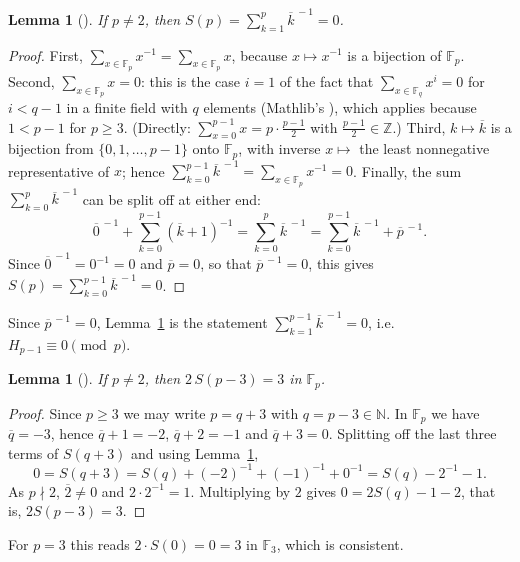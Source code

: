 \documentclass[11pt]{amsart}
\theoremstyle{plain}
\newtheorem{lemma}[theorem]{Lemma}
\theoremstyle{definition}
\newcommand{\N}{\mathbb{N}}
\newcommand{\Z}{\mathbb{Z}}
\newcommand{\F}{\mathbb{F}_p}
\newcommand{\res}[1]{\overline{#1}}
\begin{document}
\begin{lemma}[]\label{lem:self}
If $p\ne2$, then $S(p)=\sum_{k=1}^{p}\res k^{\,-1}=0$.
\end{lemma}

\begin{proof}
First, $\sum_{x\in\F}x^{-1}=\sum_{x\in\F}x$, because $x\mapsto x^{-1}$ is a bijection of $\F$. Second, $\sum_{x\in\F}x=0$: this is the case $i=1$ of the fact that $\sum_{x\in\mathbb{F}_q}x^i=0$ for $i<q-1$ in a finite field with $q$ elements (Mathlib's ), which applies because $1<p-1$ for $p\ge3$. (Directly: $\sum_{x=0}^{p-1}x=p\cdot\frac{p-1}2$ with $\frac{p-1}{2}\in\Z$.) Third, $k\mapsto\res k$ is a bijection from $\{0,1,\dots,p-1\}$ onto $\F$, with inverse $x\mapsto$ the least nonnegative representative of $x$; hence $\sum_{k=0}^{p-1}\res k^{\,-1}=\sum_{x\in\F}x^{-1}=0$.
Finally, the sum $\sum_{k=0}^{p}\res k^{\,-1}$ can be split off at either end:
\[
  \res 0^{\,-1}+\sum_{k=0}^{p-1}(\res k+1)^{-1}=\sum_{k=0}^{p}\res k^{\,-1}=\sum_{k=0}^{p-1}\res k^{\,-1}+\res p^{\,-1}.
\]
Since $\res0^{\,-1}=0^{-1}=0$ and $\res p=0$, so that $\res p^{\,-1}=0$, this gives $S(p)=\sum_{k=0}^{p-1}\res k^{\,-1}=0$.
\end{proof}

Since $\res p^{\,-1}=0$, Lemma~\ref{lem:self} is the statement $\sum_{k=1}^{p-1}\res k^{\,-1}=0$, i.e.\ $H_{p-1}\equiv0\pmod p$.

\begin{lemma}[]\label{lem:val}
If $p\ne2$, then $2\,S(p-3)=3$ in $\F$.
\end{lemma}

\begin{proof}
Since $p\ge3$ we may write $p=q+3$ with $q=p-3\in\N$. In $\F$ we have $\res q=-3$, hence $\res q+1=-2$, $\res q+2=-1$ and $\res q+3=0$. Splitting off the last three terms of $S(q+3)$ and using Lemma~\ref{lem:self},
\[
  0=S(q+3)=S(q)+(-2)^{-1}+(-1)^{-1}+0^{-1}=S(q)-2^{-1}-1 .
\]
As $p\nmid2$, $\res2\ne0$ and $2\cdot2^{-1}=1$. Multiplying by $2$ gives $0=2S(q)-1-2$, that is, $2S(p-3)=3$.
\end{proof}

For $p=3$ this reads $2\cdot S(0)=0=3$ in $\mathbb{F}_3$, which is consistent.
\end{document}
